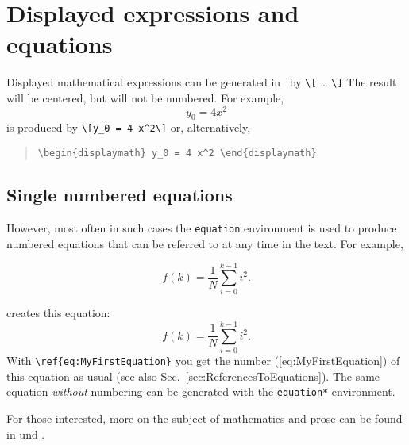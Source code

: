 \section{Displayed expressions and equations}

Displayed mathematical expressions can be generated in \latex\ by \verb!\[! \ldots 
\verb!\]! The result will be centered, but will not be numbered.
For example, \[y_0 = 4 x^2\] is produced by \verb!\[y_0 = 4 x^2\]!
or, alternatively,
\begin{quote}
 \verb!\begin{displaymath} y_0 = 4 x^2 \end{displaymath}!
\end{quote}

\subsection{Single numbered equations}

However, most often in such cases the \texttt{equation} environment is used
to produce numbered equations that can be referred to at any time in the text.
For example, 
%
\begin{LaTeXCode}[numbers=none]
\begin{equation}
	f(k) = \frac{1}{N} \sum_{i=0}^{k-1} i^2 .
	\label{eq:MyFirstEquation}
\end{equation}
\end{LaTeXCode}
%
creates this equation:
%
\begin{equation}
	f(k) = \frac{1}{N} \sum_{i=0}^{k-1} i^2 .
	\label{eq:MyFirstEquation}
\end{equation}
%
With \verb|\ref{eq:MyFirstEquation}| you get the number (\ref{eq:MyFirstEquation})
of this equation as usual (see also Sec.\ \ref{sec:ReferencesToEquations}).
The same equation \emph{without} numbering can be generated with the \texttt{equation*}
environment.
%
\begin{center}
	\setlength{\fboxrule}{0.2mm}
	\setlength{\fboxsep}{2mm}
\end{center}
%
For those interested, more on the subject of mathematics and prose can be found in
\cite{Mermin1989} und \cite{Higham2020}.


